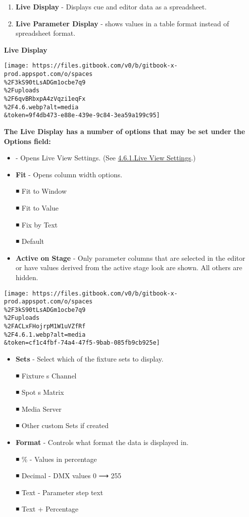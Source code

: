 \documentclass[
]{article}
\providecommand{\tightlist}{%
  \setlength{\itemsep}{0pt}\setlength{\parskip}{0pt}}
\begin{document}
\begin{enumerate}
\def\labelenumi{\arabic{enumi}.}
\tightlist
\item
  \textbf{Live Display} - Displays cue and editor data as a spreadsheet.
\item
  \textbf{Live Parameter Display} - shows values in a table format instead of spreadsheet format.
\end{enumerate}

\textbf{Live Display}

\texttt{[image: https://files.gitbook.com/v0/b/gitbook-x-prod.appspot.com/o/spaces\\\%2F3kS90tLsADGm1ocbe7q9\\\%2Fuploads\\\%2F6qvBRbxpA4zVqzi1eqFx\\\%2F4.6.webp?alt=media\\\&token=9f4db473-e88e-439e-9c84-3ea59a199c95]}

\textbf{The Live Display has a number of options that may be set under the Options field:}

\begin{itemize}
\item
  \href{image.png}{} - Opens Live View Settings. (See \href{/s/3kS90tLsADGm1ocbe7q9/~/changes/WdkBzgj8gGqCInAC3DkK/4.-graphical-user-interface-gui/4.-graphical-user-interface-gui/4.8.1.-live-view-settings}{4.6.1.Live View Settings}.)
\item
  \textbf{Fit} - Opens column width options.

  ◾ Fit to Window

  ◾ Fit to Value

  ◾ Fix by Text

  ◾ Default
\item
  \textbf{Active on Stage} - Only parameter columns that are selected in the editor or have values derived from the active stage look are shown. All others are hidden.
\end{itemize}

\texttt{[image: https://files.gitbook.com/v0/b/gitbook-x-prod.appspot.com/o/spaces\\\%2F3kS90tLsADGm1ocbe7q9\\\%2Fuploads\\\%2FACLxFHojrpM1W1uVZfRf\\\%2F4.6.1.webp?alt=media\\\&token=cf1c4fbf-74a4-47f5-9bab-085fb9cb925e]}

\begin{itemize}
\item
  \textbf{Sets} - Select which of the fixture sets to display.

  ◾ Fixture s Channel

  ◾ Spot s Matrix

  ◾ Media Server

  ◾ Other custom Sets if created
\item
  \textbf{Format} - Controls what format the data is displayed in.

  ◾ \% - Values in percentage

  ◾ Decimal - DMX values 0 ⟶ 255

  ◾ Text - Parameter step text

  ◾ Text + Percentage
\end{itemize}
\end{document}
